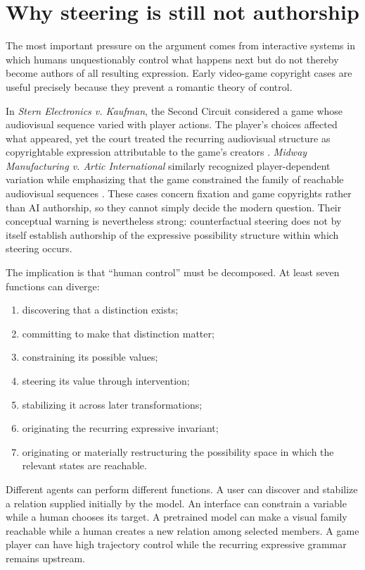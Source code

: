 \documentclass[11pt]{article}
\begin{document}
\section{Why steering is still not authorship}

The most important pressure on the argument comes from interactive systems in which humans unquestionably control what happens next but do not thereby become authors of all resulting expression. Early video-game copyright cases are useful precisely because they prevent a romantic theory of control.

In \emph{Stern Electronics v. Kaufman}, the Second Circuit considered a game whose audiovisual sequence varied with player actions. The player's choices affected what appeared, yet the court treated the recurring audiovisual structure as copyrightable expression attributable to the game's creators \citep{SternElectronics1982}. \emph{Midway Manufacturing v. Artic International} similarly recognized player-dependent variation while emphasizing that the game constrained the family of reachable audiovisual sequences \citep{MidwayArtic1983}. These cases concern fixation and game copyrights rather than AI authorship, so they cannot simply decide the modern question. Their conceptual warning is nevertheless strong: counterfactual steering does not by itself establish authorship of the expressive possibility structure within which steering occurs.

The implication is that ``human control'' must be decomposed. At least seven functions can diverge:

\begin{enumerate}
\item discovering that a distinction exists;
\item committing to make that distinction matter;
\item constraining its possible values;
\item steering its value through intervention;
\item stabilizing it across later transformations;
\item originating the recurring expressive invariant;
\item originating or materially restructuring the possibility space in which the relevant states are reachable.
\end{enumerate}

Different agents can perform different functions. A user can discover and stabilize a relation supplied initially by the model. An interface can constrain a variable while a human chooses its target. A pretrained model can make a visual family reachable while a human creates a new relation among selected members. A game player can have high trajectory control while the recurring expressive grammar remains upstream.
\end{document}
